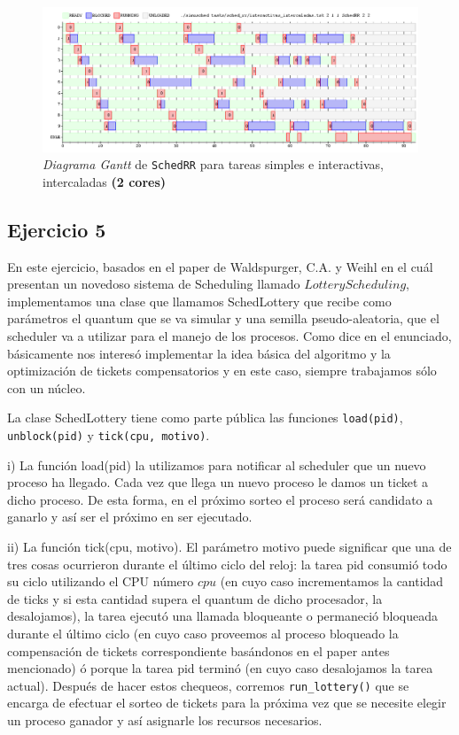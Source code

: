 \documentclass[11pt, a4paper, twoside]{article}
\begin{document}
\begin{figure}
  \centering
  \includegraphics [width=\textwidth]{../graficos/sched_rr/interactivas-intercaladas-2.png}
  \caption{\emph{Diagrama Gantt} de \texttt{SchedRR} para tareas simples e interactivas, intercaladas \textbf{(2 cores)}}
  \label{fig:gantt-sched-rr-interactivas-interrcaladas-2}
\end{figure}



\clearpage
\subsection{Ejercicio 5}
En este ejercicio, basados en el paper de Waldspurger, C.A. y Weihl en el cuál presentan un 
novedoso sistema de Scheduling llamado $Lottery Scheduling$, implementamos una clase que llamamos
SchedLottery que recibe como parámetros el quantum que se va simular y una semilla 
pseudo-aleatoria, que el scheduler va a utilizar para el manejo de los procesos. Como dice en el
enunciado, básicamente nos interesó implementar la idea básica del algoritmo y la 
optimización de tickets compensatorios y en este caso, siempre trabajamos sólo con un núcleo. 

La clase SchedLottery tiene como parte pública las funciones \texttt{load(pid)}, \texttt{unblock(pid)} 
y \texttt{tick(cpu, motivo)}. 

i) La función load(pid) la utilizamos para notificar al scheduler
que un nuevo proceso ha llegado. Cada vez que llega un nuevo proceso le damos un ticket a dicho proceso.
De esta forma, en el próximo sorteo el proceso será candidato a ganarlo y así ser el próximo 
en ser ejecutado. 

ii) La función
tick(cpu, motivo). El parámetro motivo puede significar que una de tres cosas
ocurrieron durante el último ciclo del reloj: la tarea pid consumió todo su
ciclo utilizando el CPU número $cpu$ (en cuyo caso incrementamos la cantidad de ticks y si esta cantidad supera el
quantum de dicho procesador, la desalojamos), la tarea ejecutó una llamada bloqueante o permaneció 
bloqueada durante el último ciclo (en cuyo caso proveemos al proceso bloqueado la compensación 
de tickets correspondiente basándonos en el paper antes mencionado) ó porque la tarea pid 
terminó (en cuyo caso desalojamos la tarea
actual). Después de hacer estos chequeos, corremos \texttt{run\_lottery()} que se encarga de efectuar el 
sorteo de tickets para la próxima vez que se necesite elegir un proceso ganador y así asignarle 
los recursos necesarios. 
\end{document}
